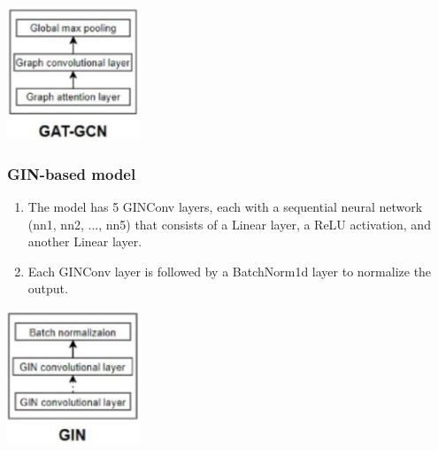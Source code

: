 \documentclass[11pt, a4paper]{article}
\begin{document}
                \begin{center}
                    \includegraphics[width=0.3\textwidth]{GAT_GCN.PNG}
                \end{center}
            
            \subsubsection{GIN-based model}
                \begin{enumerate}
                    \item The model has 5 GINConv layers, each with a sequential neural network (nn1, nn2, ..., nn5) that consists of a Linear layer, a ReLU activation, and another Linear layer.
                    \item Each GINConv layer is followed by a BatchNorm1d layer to normalize the output.
                \end{enumerate}

                \begin{center}
                    \includegraphics[width=0.3\textwidth]{GIN_model.PNG}
                \end{center}

               
\end{document}

